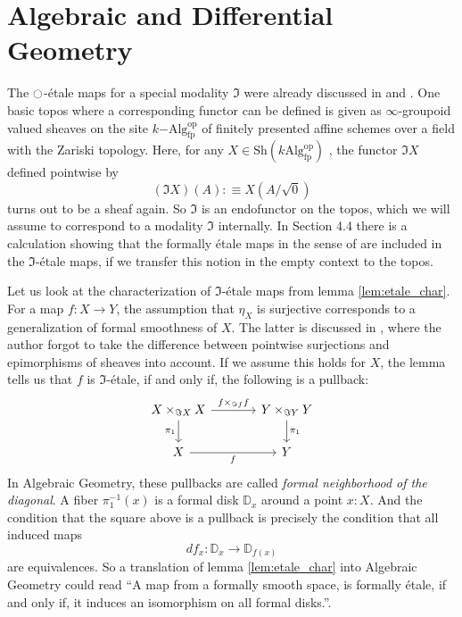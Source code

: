 \documentclass[9pt,twosided]{amsart}
\newcommand{\bD}{\mathbb D}
\begin{document}
\section{Algebraic and Differential Geometry}

The ${\ocircle}$-étale maps for a special modality $\Im$ were already discussed in \cite{wellen-thesis} and \cite{wellen-cartan-geometry}.
One basic topos where a corresponding functor can be defined is given as $\infty$-groupoid valued sheaves on the site $k\mathrm{-Alg}^{\mathrm{op}}_{\mathrm{fp}}$ of finitely presented affine schemes over a field with the Zariski topology. Here, for any $X\in\mathrm{Sh}(k\mathrm{Alg}^\mathrm{op}_{\mathrm{fp}})$ , the functor $\Im X$ defined pointwise by
\[ (\Im X)(A):\equiv X(A/\sqrt{0})\]
turns out to be a sheaf again. So $\Im$ is an endofunctor on the topos, which we will assume to correspond to a modality $\Im$ internally.
In \cite{wellen-thesis}{Section 4.4} there is a calculation showing that the formally étale maps in the sense of \cite[§ 17]{GrothendieckDieudonne} are included in the $\Im$-étale maps, if we transfer this notion in the empty context to the topos.

Let us look at the characterization of $\Im$-étale maps from lemma \ref{lem:etale_char}.
For a map $f:X\to Y$, the assumption that $\eta_X$ is surjective corresponds to a generalization of formal smoothness of $X$.
The latter is discussed in \cite[Section 4.4]{wellen-thesis}, where the author forgot to take the difference between pointwise surjections and epimorphisms of sheaves into account.
If we assume this holds for $X$, the lemma tells us that $f$ is $\Im$-étale, if and only if, the following is a pullback:
\begin{equation*}
\begin{tikzcd}[column sep=large]
X\times_{\Im X} X \arrow[d,swap,"\pi_1"] \arrow[r,"{f\times_{\Im f} f}"] & Y\times_{\Im Y} Y \arrow[d,"\pi_1"] \\
X \arrow[r,swap,"f"] & Y
\end{tikzcd}
\end{equation*}
In Algebraic Geometry, these pullbacks are called \emph{formal neighborhood of the diagonal}.
A fiber $\pi_1^{-1}(x)$ is a formal disk $\bD_x$ around a point $x:X$.
And the condition that the square above is a pullback is precisely the condition that all induced maps
\[ df_x:\bD_x\to\bD_{f(x)}\]
are equivalences. So a translation of lemma \ref{lem:etale_char} into Algebraic Geometry could read ``A map from a formally smooth space, is formally étale, if and only if, it induces an isomorphism on all formal disks.''.


\printbibliography
\end{document}
